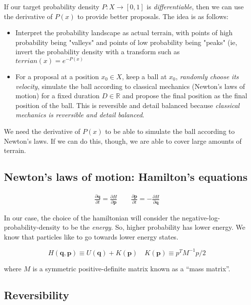\documentclass[titlepage]{article}
\newcommand{\R}{\mathbb{R}}
\newcommand{\p}{\mathbf{p}}
\newcommand{\q}{\mathbf{q}}
\begin{document}
If our target probability density $P: X \rightarrow [0, 1]$ is \emph{differentiable},
then we can use the derivative of $P(x)$ to provide better proposals. The idea
is as follows:

\begin{itemize}
    \item Interpret the probability landscape as actual terrain, with
        points of high probability being "valleys" and points of low probability
        being "peaks" (ie, invert the probability density with a transform
        such as $terrian(x) = e^{-P(x)}$
    \item For a proposal at a position $x_0 \in X$, keep a ball at $x_0$,
        \emph{randomly choose its velocity}, simulate the ball according to 
        classical mechanics (Newton's laws of motion) for a fixed duration $D \in \R$
        and propose the final position as the final position of the ball. This
        is reversible and detail balanced because 
        \emph{classical mechanics is reversible and detail balanced}.
\end{itemize}
We need the derivative of $P(x)$ to be able to simulate the ball according
to Newton's laws. If we can do this, though, we are able to cover large
amounts of terrain.


\subsection{Newton's laws of motion: Hamilton's equations}

\begin{align*}
    \frac{\partial \q}{\partial t} = \frac{\partial H}{\partial \p} \qquad
    \frac{\partial \p}{\partial t} = - \frac{\partial H}{\partial \q}
\end{align*}

In our case, the choice of the hamiltonian will consider the negative-log-probability-density
to be the \emph{energy}. So, higher probability has lower energy. We know that
particles like to go towards lower energy states.

$$
H(\q, \p) \equiv  U(\q) + K(\p) \quad K(\p) \equiv p^T M^{-1} p/2
$$

where $M$ is a symmetric positive-definite matrix known as a ``mass matrix''.


\subsection{Reversibility}
\end{document}
